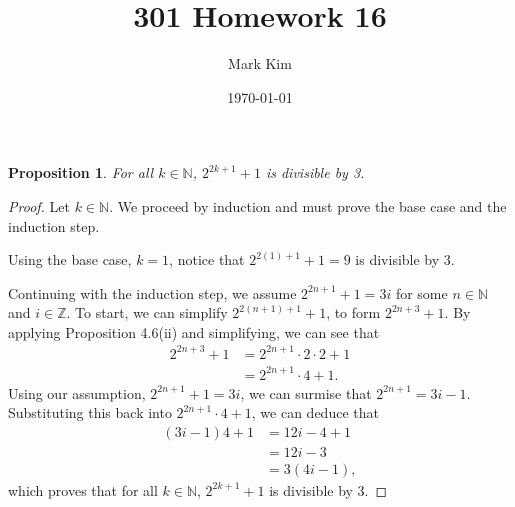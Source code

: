 \documentclass[12pt]{amsart}
\title{301 Homework 16}
\author{Mark Kim}
\date{\today}
\newcommand{\Z}{\mathbb{Z}}
\newcommand{\N}{\mathbb{N}}
\newtheorem*{proposition}{Proposition}
\begin{document}
\maketitle

\begin{proposition}
For all $k\in\N$, $2^{2k+1} + 1$ is divisible by 3.
\end{proposition}

\begin{proof}
Let $k\in\N$. We proceed by induction and must prove the base case and the induction step.

Using the base case, $k=1$, notice that $2^{2(1)+1} + 1=9$ is divisible by $3$.

Continuing with the induction step, we assume $2^{2n+1} + 1 = 3i$ for some $n\in\N$ and $i\in\Z$.  To start, we can simplify $2^{2(n+1)+1} + 1$,  to form $2^{2n+3} + 1.$ By applying Proposition 4.6(ii) and simplifying, we can see that
\begin{align*}
2^{2n+3} + 1 &= 2^{2n+1} \cdot 2 \cdot 2 + 1\\
&= 2^{2n+1} \cdot 4 + 1.
\end{align*}
Using our assumption, $2^{2n+1} + 1 = 3i$, we can surmise that $2^{2n+1}= 3i - 1$.  Substituting this back into $2^{2n+1} \cdot 4 + 1$, we can deduce that
\begin{align*}
	(3i-1)4 + 1 &= 12i - 4 + 1\\
	&= 12i-3\\
	&= 3(4i-1),
\end{align*}
which proves that for all $k\in\N$, $2^{2k+1} + 1$ is divisible by 3.
\end{proof}
\end{document}
